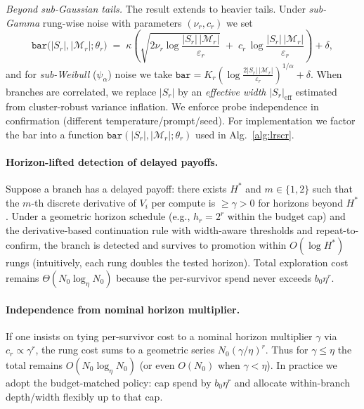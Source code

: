 \documentclass{article}
\begin{document}
\emph{Beyond sub-Gaussian tails.} The result extends to heavier tails.
Under \emph{sub-Gamma} rung-wise noise with parameters $(\nu_r,c_r)$ we set
\begin{equation}
\texttt{bar}\big(|S_r|,|\mathcal{M}_r|;\theta_r\big)\;=\;\kappa\!\left(\sqrt{2\nu_r\log\frac{|S_r|\,|\mathcal{M}_r|}{\varepsilon_r}}\;+\;c_r\,\log\frac{|S_r|\,|\mathcal{M}_r|}{\varepsilon_r}\right)+\delta,
\end{equation}
and for \emph{sub-Weibull} ($\psi_\alpha$) noise we take
$\texttt{bar}=K_r\!\left(\log\frac{2|S_r|\,|\mathcal{M}_r|}{\varepsilon_r}\right)^{1/\alpha}+\delta$.
When branches are correlated, we replace $|S_r|$ by an \emph{effective width} $|S_r|_{\mathrm{eff}}$ estimated from cluster-robust variance inflation.
We enforce probe independence in confirmation (different temperature/prompt/seed).
For implementation we factor the bar into a function $\texttt{bar}(|S_r|,|\mathcal{M}_r|;\theta_r)$ used in Alg.~\ref{alg:lrscr}.

\paragraph{Horizon-lifted detection of delayed payoffs.}
Suppose a branch has a delayed payoff: there exists $H^{*}$ and $m\!\in\!\{1,2\}$ such that the $m$-th discrete derivative of $V_i$ per compute is $\ge \gamma>0$ for horizons beyond $H^{*}$.
Under a geometric horizon schedule (e.g., $h_r=2^r$ within the budget cap) and the derivative-based continuation rule with width-aware thresholds and repeat-to-confirm, the branch is detected and survives to promotion within $O(\log H^{*})$ rungs (intuitively, each rung doubles the tested horizon).
Total exploration cost remains $\Theta(N_0 \log_\eta N_0)$ because the per-survivor spend never exceeds $b_0\eta^r$.

\paragraph{Independence from nominal horizon multiplier.}
If one insists on tying per-survivor cost to a nominal horizon multiplier $\gamma$ via $c_r\propto \gamma^r$, the rung cost sums to a geometric series $N_0(\gamma/\eta)^r$.
Thus for $\gamma\le\eta$ the total remains $O(N_0\log_\eta N_0)$ (or even $O(N_0)$ when $\gamma<\eta$).
In practice we adopt the budget-matched policy: cap spend by $b_0\eta^r$ and allocate within-branch depth/width flexibly up to that cap.

\vspace{0.5em}
\end{document}
